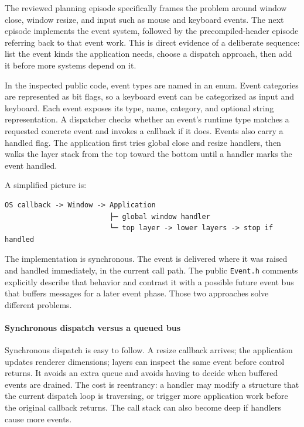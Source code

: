 The reviewed planning episode specifically frames the problem around window close, window resize, and input such as mouse and keyboard events. The next episode implements the event system, followed by the precompiled-header episode referring back to that event work. This is direct evidence of a deliberate sequence: list the event kinds the application needs, choose a dispatch approach, then add it before more systems depend on it.

In the inspected public code, event types are named in an enum. Event categories are represented as bit flags, so a keyboard event can be categorized as input and keyboard. Each event exposes its type, name, category, and optional string representation. A dispatcher checks whether an event's runtime type matches a requested concrete event and invokes a callback if it does. Events also carry a handled flag. The application first tries global close and resize handlers, then walks the layer stack from the top toward the bottom until a handler marks the event handled.

A simplified picture is:

\begin{verbatim}
OS callback -> Window -> Application
                         ├─ global window handler
                         └─ top layer -> lower layers -> stop if handled
\end{verbatim}

The implementation is synchronous. The event is delivered where it was raised and handled immediately, in the current call path. The public \texttt{Event.h} comments explicitly describe that behavior and contrast it with a possible future event bus that buffers messages for a later event phase. Those two approaches solve different problems.

\paragraph{Synchronous dispatch versus a queued bus}\label{synchronous-dispatch-versus-a-queued-bus}

Synchronous dispatch is easy to follow. A resize callback arrives; the application updates renderer dimensions; layers can inspect the same event before control returns. It avoids an extra queue and avoids having to decide when buffered events are drained. The cost is reentrancy: a handler may modify a structure that the current dispatch loop is traversing, or trigger more application work before the original callback returns. The call stack can also become deep if handlers cause more events.

